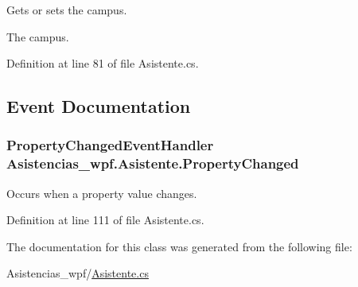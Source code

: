 Gets or sets the campus. 

The campus. 

Definition at line 81 of file Asistente.\-cs.



\subsection{Event Documentation}
\hypertarget{class_asistencias__wpf_1_1_asistente_a1d1bb982d69d545e282360e1d0b57472}{
\subsubsection[{Property\-Changed}]{\setlength{\rightskip}{0pt plus 5cm}Property\-Changed\-Event\-Handler Asistencias\-\_\-wpf.\-Asistente.\-Property\-Changed}}\label{class_asistencias__wpf_1_1_asistente_a1d1bb982d69d545e282360e1d0b57472}


Occurs when a property value changes. 



Definition at line 111 of file Asistente.\-cs.



The documentation for this class was generated from the following file\-:\begin{DoxyCompactItemize}
\item 
Asistencias\-\_\-wpf/\hyperlink{_asistente_8cs}{Asistente.\-cs}\end{DoxyCompactItemize}
